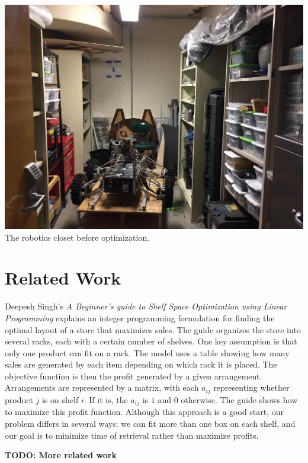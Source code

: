 \documentclass[10pt]{article}
\theoremstyle{named}
\begin{document}
\begin{center}
  \includegraphics[scale=0.15]{closet.jpg} \\
  The robotics closet before optimization. 
\end{center}

\section{Related Work}
Deepesh Singh's \emph{A Beginner’s guide to Shelf Space Optimization using Linear Programming}
explains an integer programming formulation for finding the optimal layout of a store
that maximizes sales. The guide organizes the store into several racks, each with
a certain number of shelves. One key assumption is that only one product can fit
on a rack. The model uses a table showing how many sales are generated by each item
depending on which rack it is placed. The objective function is then the profit
generated by a given arrangement. Arrangements are represented by a matrix, with
each $a_{ij}$ representing whether product $j$ is on shelf $i$. If it is, the
$a_{ij}$ is $1$ and $0$ otherwise. The guide shows how to maximize this profit function.
Although this approach is a good start, our problem differs in several ways: we can
fit more than one box on each shelf, and our goal is to minimize time of retrieval
rather than maximize profits.

\textbf{\color{red} TODO: More related work}
\end{document}
